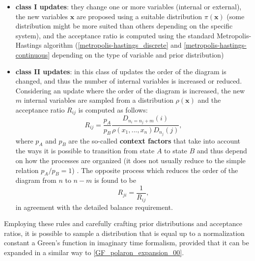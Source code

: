 \begin{itemize}
    \item \textbf{class I updates}: they change one or more variables (internal or external), the new variables $\mathbf{x}$ are proposed using a suitable
    distribution $\pi(\mathbf{x})$ (some distribution might be more suited than others depending on the specific system), and the acceptance ratio is computed using 
    the standard Metropolis-Hastings algorithm (\ref{metropolis-hastings_discrete} and \ref{metropolis-hastings-continuous} depending on the type of variable and prior 
    distribution)
    \item \textbf{class II updates}: in this class of updates the order of the diagram is changed, and thus the number of internal variables is increased or 
    reduced. Considering an update where the order of the diagram is increased, the new $m$ internal variables are sampled from a distribution $\rho(\mathbf{x})$ 
    and the acceptance ratio $R_{ij}$ is computed as follows:
    \begin{equation}
        R_{ij}=\frac{p_A}{p_B}\frac{D_{n_i=n_j+m}(i)}{\rho(x_1,...,x_n)D_{n_j}(j)},
    \end{equation}
    where $p_A$ and $p_B$ are the so-called \textbf{context factors} that take into account the ways it is possible to transition from state $A$ to 
    state $B$ and thus depend on how the processes are organized (it does not usually reduce to the simple relation $p_A/p_B=1$) \cite{fehske2007computational}. The 
    opposite process which reduces the order of the diagram from $n$ to $n-m$ is found to be 
    \begin{equation}
        R_{ji}=\frac{1}{R_{ij}},
    \end{equation}
    in agreement with the detailed balance requirement.
\end{itemize}
Employing these rules and carefully crafting prior distributions and acceptance ratios, it is possible to sample a distribution that is 
equal up to a normalization constant a Green's function in imaginary time formalism, provided that it can be expanded in a similar way to \ref{GF_polaron_expansion_00}.

